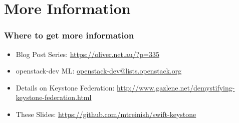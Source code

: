 \documentclass[aspectratio=169,11pt,hyperref={colorlinks=true}]{beamer}
\begin{document}
\section{More Information}
\begin{frame}
\frametitle{Where to get more information}
    \begin{itemize}
        \item Blog Post Series: \href{https://oliver.net.au/?p=335}{https://oliver.net.au/?p=335}
        \item openstack-dev ML: \href{mailto:openstack-dev@lists.openstack.org}{openstack-dev@lists.openstack.org}
        \item Details on Keystone Federation: \href{http://www.gazlene.net/demystifying-keystone-federation.html}{http://www.gazlene.net/demystifying-keystone-federation.html}
        \item These Slides: \href{https://github.com/mtreinish/swift-keystone}{https://github.com/mtreinish/swift-keystone}
   \end{itemize}
\end{frame}
\end{document}
